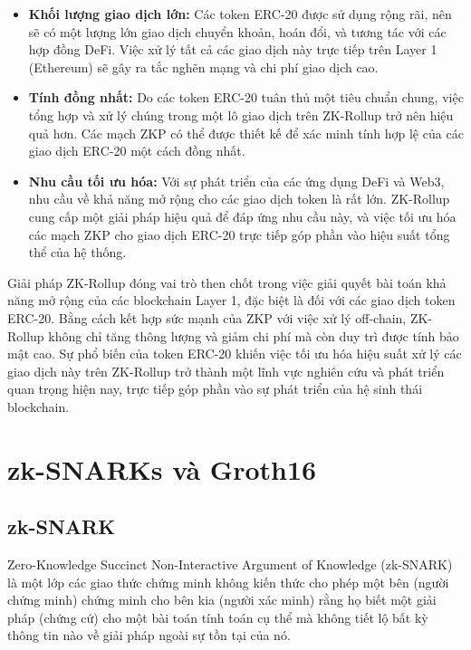 \begin{itemize}
    \item \textbf{Khối lượng giao dịch lớn:} Các token ERC-20 được sử dụng rộng rãi, nên sẽ có một lượng lớn giao dịch chuyển khoản, hoán đổi, và tương tác với các hợp đồng DeFi. Việc xử lý tất cả các giao dịch này trực tiếp trên Layer 1 (Ethereum) sẽ gây ra tắc nghẽn mạng và chi phí giao dịch cao.

    \item \textbf{Tính đồng nhất:} Do các token ERC-20 tuân thủ một tiêu chuẩn chung, việc tổng hợp và xử lý chúng trong một lô giao dịch trên ZK-Rollup trở nên hiệu quả hơn. Các mạch ZKP có thể được thiết kế để xác minh tính hợp lệ của các giao dịch ERC-20 một cách đồng nhất.

    \item \textbf{Nhu cầu tối ưu hóa:} Với sự phát triển của các ứng dụng DeFi và Web3, nhu cầu về khả năng mở rộng cho các giao dịch token là rất lớn. ZK-Rollup cung cấp một giải pháp hiệu quả để đáp ứng nhu cầu này, và việc tối ưu hóa các mạch ZKP cho giao dịch ERC-20 trực tiếp góp phần vào hiệu suất tổng thể của hệ thống.
\end{itemize}

Giải pháp ZK-Rollup đóng vai trò then chốt trong việc giải quyết bài toán khả năng mở rộng của các blockchain Layer 1, đặc biệt là đối với các giao dịch token ERC-20. Bằng cách kết hợp sức mạnh của ZKP với việc xử lý off-chain, ZK-Rollup không chỉ tăng thông lượng và giảm chi phí mà còn duy trì được tính bảo mật cao. Sự phổ biến của token ERC-20 khiến việc tối ưu hóa hiệu suất xử lý các giao dịch này trên ZK-Rollup trở thành một lĩnh vực nghiên cứu và phát triển quan trọng hiện nay, trực tiếp góp phần vào sự phát triển của hệ sinh thái blockchain.

\section{zk-SNARKs và Groth16}
\subsection{zk-SNARK}
Zero-Knowledge Succinct Non-Interactive Argument of Knowledge (zk-SNARK) \cite{ballesteros2024enhancing} là một lớp các giao thức chứng minh không kiến thức cho phép một bên (người chứng minh) chứng minh cho bên kia (người xác minh) rằng họ biết một giải pháp (chứng cứ) cho một bài toán tính toán cụ thể mà không tiết lộ bất kỳ thông tin nào về giải pháp ngoài sự tồn tại của nó.

